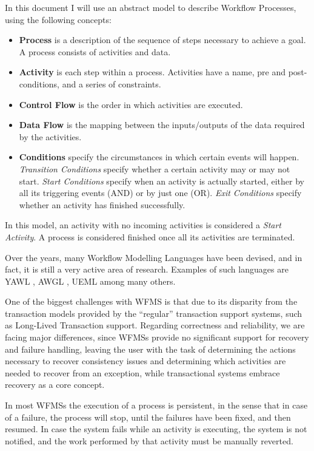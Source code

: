 \documentclass{llncs}
\begin{document}
In this document I will use an abstract model to describe Workflow
Processes, using the following concepts:
\begin{itemize}
\item {\bf Process} is a description of the sequence of steps
  necessary to achieve a goal. A process consists of activities and
  data.
\item {\bf Activity} is each step within a process. Activities have a
  name, pre and post-conditions, and a series of constraints.
\item {\bf Control Flow} is the order in which activities are
  executed.
\item {\bf Data Flow} is the mapping between the inputs/outputs of the
  data required by the activities.
\item {\bf Conditions} specify the circumstances in which certain
  events will happen. {\it Transition Conditions} specify whether a
  certain activity may or may not start. {\it Start Conditions}
  specify when an activity is actually started, either by all its
  triggering events (AND) or by just one (OR). {\it Exit Conditions}
  specify whether an activity has finished successfully.
\end{itemize}
In this model, an activity with no incoming activities is considered a
{\it Start Activity}. A process is considered finished once all its
activities are terminated.

Over the years, many Workflow Modelling Languages have been devised,
and in fact, it is still a very active area of research. Examples of
such languages are YAWL \cite{van2005yawl}, AWGL
\cite{fahringer2005specification}, UEML \cite{vernadat2002ueml} among
many others.

One of the biggest challenges with WFMS is that due to its disparity
from the transaction models provided by the ``regular'' transaction
support systems, such as Long-Lived Transaction support. Regarding
correctness and reliability, we are facing major differences, since
WFMSs provide no significant support for recovery and failure
handling, leaving the user with the task of determining the actions
necessary to recover consistency issues and determining which
activities are needed to recover from an exception, while
transactional systems embrace recovery as a core concept.

In most WFMSs the execution of a process is persistent, in the sense
that in case of a failure, the process will stop, until the failures
have been fixed, and then resumed. In case the system fails while an
activity is executing, the system is not notified, and the work
performed by that activity must be manually reverted.
\end{document}
